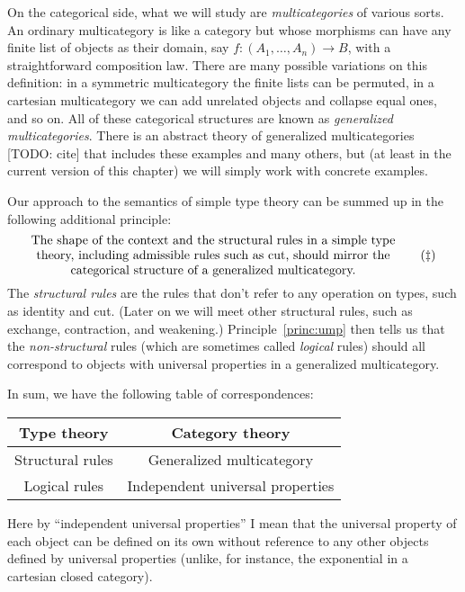 \documentclass{book}
\begin{document}
On the categorical side, what we will study are \emph{multicategories} of various sorts.
An ordinary multicategory is like a category but whose morphisms can have any finite list of objects as their domain, say $f:(A_1,\dots,A_n) \to B$, with a straightforward composition law.
There are many possible variations on this definition: in a symmetric multicategory the finite lists can be permuted, in a cartesian multicategory we can add unrelated objects and collapse equal ones, and so on.
All of these categorical structures are known as \emph{generalized multicategories}.
There is an abstract theory of generalized multicategories [TODO: cite] that includes these examples and many others, but (at least in the current version of this chapter) we will simply work with concrete examples.

Our approach to the semantics of simple type theory can be summed up in the following additional principle:
\begin{equation}\label{princ:structural}
  \parbox{4in}{\centering The shape of the context and the structural rules in a simple type theory, including admissible rules such as cut, should mirror the categorical structure of a generalized multicategory.}\tag{$\ddagger$}
\end{equation}
The \emph{structural rules} are the rules that don't refer to any operation on types, such as identity and cut.
(Later on we will meet other structural rules, such as exchange, contraction, and weakening.)
Principle~\eqref{princ:ump} then tells us that the \emph{non-structural} rules (which are sometimes called \emph{logical} rules) should all correspond to objects with universal properties in a generalized multicategory.

In sum, we have the following table of correspondences:
\begin{center}
  \begin{tabular}{c|c}
    Type theory & Category theory\\\hline
    Structural rules & Generalized multicategory\\
    Logical rules & Independent universal properties
  \end{tabular}
\end{center}
Here by ``independent universal properties'' I mean that the universal property of each object can be defined on its own without reference to any other objects defined by universal properties (unlike, for instance, the exponential in a cartesian closed category).
\end{document}
